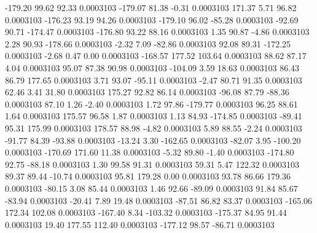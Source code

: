      -179.20       99.62       92.33     0.0003103
     -179.07       81.38       -0.31     0.0003103
      171.37        5.71       96.82     0.0003103
     -176.23       93.19       94.26     0.0003103
     -179.10       96.02      -85.28     0.0003103
      -92.69       90.71     -174.47     0.0003103
     -176.80       93.22       88.16     0.0003103
        1.35       90.87       -4.86     0.0003103
        2.28       90.93     -178.66     0.0003103
       -2.32        7.09      -82.86     0.0003103
       92.08       89.31     -172.25     0.0003103
       -2.68        0.47        0.00     0.0003103
     -168.57      177.52      103.64     0.0003103
       88.62       87.17        4.04     0.0003103
       95.07       87.38       90.98     0.0003103
     -104.09        3.59       18.63     0.0003103
       86.43       86.79      177.65     0.0003103
        3.71       93.07      -95.11     0.0003103
       -2.47       80.71       91.35     0.0003103
       62.46        3.41       31.80     0.0003103
      175.27       92.82       86.14     0.0003103
      -96.08       87.79      -88.36     0.0003103
       87.10        1.26       -2.40     0.0003103
        1.72       97.86     -179.77     0.0003103
       96.25       88.61        1.64     0.0003103
      175.57       96.58        1.87     0.0003103
        1.13       84.93     -174.85     0.0003103
      -89.41       95.31      175.99     0.0003103
      178.57       88.98       -4.82     0.0003103
        5.89       88.55       -2.24     0.0003103
      -91.77       84.39      -93.88     0.0003103
      -13.24        3.30     -162.65     0.0003103
      -82.07        3.95     -100.20     0.0003103
     -170.69      171.60       11.38     0.0003103
       -5.32       89.80       -1.40     0.0003103
     -174.80       92.75      -88.18     0.0003103
        1.30       99.58       91.31     0.0003103
       59.31        5.47      122.32     0.0003103
       89.37       89.44      -10.74     0.0003103
       95.81      179.28        0.00     0.0003103
       93.78       86.66      179.36     0.0003103
      -80.15        3.08       85.44     0.0003103
        1.46       92.66      -89.09     0.0003103
       91.84       85.67      -83.94     0.0003103
      -20.41        7.89       19.48     0.0003103
      -87.51       86.82       83.37     0.0003103
     -165.06      172.34      102.08     0.0003103
     -167.40        8.34     -103.32     0.0003103
     -175.37       84.95       91.44     0.0003103
       19.40      177.55      112.40     0.0003103
     -177.12       98.57      -86.71     0.0003103
